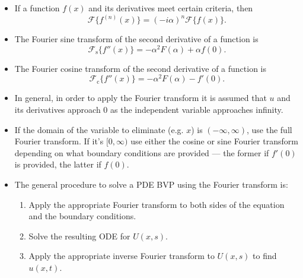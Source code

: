 \documentclass{article}
\begin{document}
\begin{itemize}
  \item If a function $f(x)$ and its derivatives meet certain criteria, then \[\mathcal{F}\{f^{(n)}(x)\} = (-i \alpha)^n \mathcal{F}\{f(x)\}.\]

  \item The Fourier sine transform of the second derivative of a function is \[\mathcal{F}_\text{s}\{f''(x)\} = -\alpha^2 F(\alpha) + \alpha f(0).\]

  \item The Fourier cosine transform of the second derivative of a function is \[\mathcal{F}_\text{c}\{f''(x)\} = -\alpha^2 F(\alpha) - f'(0).\]

  \item In general, in order to apply the Fourier transform it is assumed that $u$ and its derivatives approach $0$ as the independent variable approaches infinity.

  \item If the domain of the variable to eliminate (e.g. $x$) is $(-\infty, \infty)$, use the full Fourier transform. If it's $[0, \infty)$ use either the cosine or sine Fourier transform depending on what boundary conditions are provided — the former if $f'(0)$ is provided, the latter if $f(0)$.

  \item The general procedure to solve a PDE BVP using the Fourier transform is:

        \begin{enumerate}
          \item Apply the appropriate Fourier transform to both sides of the equation and the boundary conditions.

          \item Solve the resulting ODE for $U(x, s)$.

          \item Apply the appropriate inverse Fourier transform to $U(x, s)$ to find $u(x, t)$.
        \end{enumerate}
\end{itemize}
\end{document}
